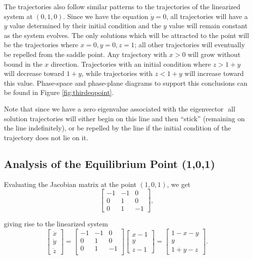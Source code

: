 \documentclass[10pt]{article}
\begin{document}
The trajectories also follow similar patterns to the trajectories of the linearized system at \((0,1,0)\). Since we have the equation \(\dot{y}=0\), all trajectories will have a \(y\) value determined by their initial condition and the \(y\) value will remain constant as the system evolves. The only solutions which will be attracted to the point will be the trajectories where \(x=0,y=0,z=1\); all other trajectories will eventually be repelled from the saddle point. Any trajectory with \(x>0\) will grow without bound in the \(x\) direction. Trajectories with an initial condition where \(z>1+y\) will decrease toward \(1+y\), while trajectories with \(z<1+y\) will increase toward this value. Phase-space and phase-plane diagrams to support this conclusions can be found in Figure \ref{fig:thirdeqpoint}.  

Note that since we have a zero eigenvalue associated with the eigenvector \(<0,1,1>\) all solution trajectories will either begin on this line and then ``stick'' (remaining on the line indefinitely), or be repelled by the line if the initial condition of the trajectory does not lie on it.

\subsection{Analysis of the Equilibrium Point (1,0,1)}
Evaluating the Jacobian matrix at the point \((1,0,1)\), we get 
\[
\left[ 
\begin{array}{ccc}
-1 & -1 & 0 \\
0 & 1 & 0 \\
0 & 1 & -1 
\end{array}
\right],
\]

giving rise to the linearized system
\[
\begin{bmatrix}
\dot{x} \\ \dot{y} \\ \dot{z}
\end{bmatrix} = 
\left[ 
\begin{array}{ccc}
-1 & -1 & 0 \\
0 & 1 & 0 \\
0 & 1 & -1 \\
\end{array}
\right]
\begin{bmatrix}
x-1 \\ y  \\ z-1
\end{bmatrix} =
\begin{bmatrix}
1-x-y \\ y \\ 1+y-z
\end{bmatrix}.
\]
\end{document}
